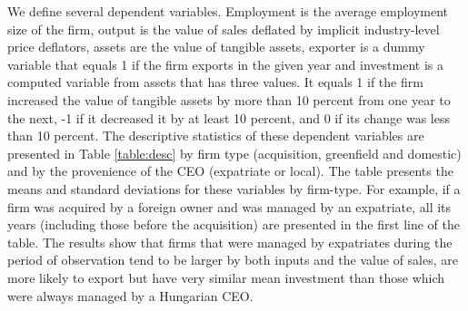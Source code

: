 \documentclass[12pt,a4paper]{article}
\begin{document}
We define several dependent variables.  Employment is the average employment size of the firm, output is the value of sales deflated by implicit industry-level price deflators, assets are the value of tangible assets, exporter is a dummy variable that equals 1 if the firm exports in the given year and investment is a computed variable from assets that has three values.  It equals 1 if the firm increased the value of tangible assets by more than 10 percent from one year to the next, -1 if it decreased it by at least 10 percent, and 0 if its change was less than 10 percent. The descriptive statistics of these dependent variables are presented in Table \ref{table:desc} by firm type (acquisition, greenfield and domestic) and by the provenience of the CEO (expatriate or local).  The table presents the means and standard deviations for these variables by firm-type.  For example, if a firm was acquired by a foreign owner and was managed by an expatriate, all its years (including those before the acquisition) are presented in the first line of the table. The results show that firms that were managed by expatriates during the period of observation tend to be larger by both inputs and the value of sales, are more likely to export but have very similar mean investment than those which were always managed by a Hungarian CEO.
\end{document}
